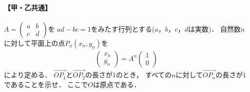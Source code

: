 \documentclass[../../main.tex]{subfiles}
\begin{document}
\paragraph{【甲・乙共通】}
$A=
\begin{pmatrix} a & b \\ c & d
\end{pmatrix}$を
$ad-bc=1$をみたす行列とする($a$，$b$，$c$，$d$は実数)．
自然数$n$に対して平面上の点$P_n(x_n,y_n)$を
\begin{align}
  \begin{pmatrix} x_n \\ y_n
  \end{pmatrix}=A^n
  \begin{pmatrix} 1 \\ 0
  \end{pmatrix}
\end{align}
により定める．
$\overrightarrow{OP_1}$と$\overrightarrow{OP_2}$の長さが1のとき，
すべての$n$に対して$\overrightarrow{OP_n}$の長さが1であることを示せ．
ここで$O$は原点である．
\end{document}
